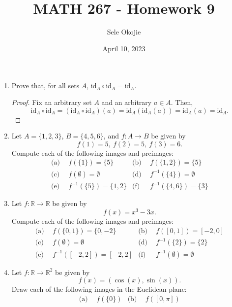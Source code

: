 \documentclass{article}
\title{MATH 267 - Homework 9}
\author{Sele Okojie}
\date{April 10, 2023}
\begin{document}
    \maketitle

    \begin{enumerate}

        \item Prove that, for all sets $A$, $\mathrm{id}_A \circ \mathrm{id}_A = \mathrm{id}_A$.
            \begin{proof}
                Fix an arbitrary set $A$ and an arbitrary $a\in A$. Then,
                \[
                    \mathrm{id}_A \circ \mathrm{id}_A = (\mathrm{id}_A \circ \mathrm{id}_A)(a) = \mathrm{id}_A(\mathrm{id}_A(a)) = \mathrm{id}_A(a) = \mathrm{id}_A.
                \]
            \end{proof}

	\item Let $A = \{ 1, 2, 3 \}$, $B = \{ 4, 5, 6 \}$, and $f : A \rightarrow B$ be given by
		\[
			f(1) = 5, \ f(2) = 5, \ f(3) = 6.
		\]
		Compute each of the following images and preimages:
		\begin{align*}
			\text{(a)} & \ \ f(\{ 1 \}) = \{ 5 \} & \text{(b)} & \ \ f(\{ 1, 2 \}) = \{ 5 \} \\
			\text{(c)} & \ \ f( \emptyset ) = \emptyset & \text{(d)} & \ \ f^{-1}(\{ 4 \}) = \emptyset \\
			\text{(e)} & \ \ f^{-1}(\{ 5 \}) = \{ 1, 2 \} & \text{(f)} & \ \ f^{-1}(\{ 4, 6 \}) = \{ 3 \}
		\end{align*}

	\item Let $f : \mathbb{R} \rightarrow \mathbb{R}$ be given by
		\[
			f(x) = x^3 - 3x.
		\]
		Compute each of the following images and preimages:
		\begin{align*}
			\text{(a)} & \ \ f(\{0, 1\}) = \{ 0, \minus2 \} & \text{(b)} & \ \ f([0,1]) = [\minus2, 0] \\
			\text{(c)} & \ \ f(\emptyset) = \emptyset & \text{(d)} & \ \ f^{-1}(\{ 2 \}) = \{ 2 \} \\
			\text{(e)} & \ \ f^{-1}([-2,2]) = [\minus2, 2] & \text{(f)} & \ \ f^{-1}(\emptyset) = \emptyset
		\end{align*}

	\item Let $f : \mathbb{R} \rightarrow \mathbb{R}^2$ be given by
		\[
			f(x) = (\cos(x), \sin(x)).
		\]
		Draw each of the following images in the Euclidean plane:
		\begin{align*}
			\text{(a)} & \ \ f(\{ 0 \}) & \text{(b)} & \ \ f([0, \pi])
		\end{align*}


\end{enumerate}
\end{document}

